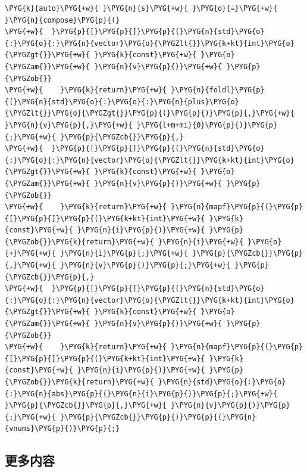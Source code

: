 \begin{codeblockbg}
\begin{Verbatim}[commandchars=\\\{\},breaklines=true,breakanywhere=true,fontsize=\codefont,xleftmargin=17bp]
\PYG{k}{auto}\PYG{+w}{ }\PYG{n}{s}\PYG{+w}{ }\PYG{o}{=}\PYG{+w}{ }\PYG{n}{compose}\PYG{p}{(}
\PYG{+w}{  }\PYG{p}{[}\PYG{p}{]}\PYG{p}{(}\PYG{n}{std}\PYG{o}{:}\PYG{o}{:}\PYG{n}{vector}\PYG{o}{\PYGZlt{}}\PYG{k+kt}{int}\PYG{o}{\PYGZgt{}}\PYG{+w}{ }\PYG{k}{const}\PYG{+w}{ }\PYG{o}{\PYGZam{}}\PYG{+w}{ }\PYG{n}{v}\PYG{p}{)}\PYG{+w}{ }\PYG{p}{\PYGZob{}}
\PYG{+w}{    }\PYG{k}{return}\PYG{+w}{ }\PYG{n}{foldl}\PYG{p}{(}\PYG{n}{std}\PYG{o}{:}\PYG{o}{:}\PYG{n}{plus}\PYG{o}{\PYGZlt{}}\PYG{o}{\PYGZgt{}}\PYG{p}{(}\PYG{p}{)}\PYG{p}{,}\PYG{+w}{ }\PYG{n}{v}\PYG{p}{,}\PYG{+w}{ }\PYG{l+m+mi}{0}\PYG{p}{)}\PYG{p}{;}\PYG{+w}{ }\PYG{p}{\PYGZcb{}}\PYG{p}{,}
\PYG{+w}{  }\PYG{p}{[}\PYG{p}{]}\PYG{p}{(}\PYG{n}{std}\PYG{o}{:}\PYG{o}{:}\PYG{n}{vector}\PYG{o}{\PYGZlt{}}\PYG{k+kt}{int}\PYG{o}{\PYGZgt{}}\PYG{+w}{ }\PYG{k}{const}\PYG{+w}{ }\PYG{o}{\PYGZam{}}\PYG{+w}{ }\PYG{n}{v}\PYG{p}{)}\PYG{+w}{ }\PYG{p}{\PYGZob{}}
\PYG{+w}{    }\PYG{k}{return}\PYG{+w}{ }\PYG{n}{mapf}\PYG{p}{(}\PYG{p}{[}\PYG{p}{]}\PYG{p}{(}\PYG{k+kt}{int}\PYG{+w}{ }\PYG{k}{const}\PYG{+w}{ }\PYG{n}{i}\PYG{p}{)}\PYG{+w}{ }\PYG{p}{\PYGZob{}}\PYG{k}{return}\PYG{+w}{ }\PYG{n}{i}\PYG{+w}{ }\PYG{o}{+}\PYG{+w}{ }\PYG{n}{i}\PYG{p}{;}\PYG{+w}{ }\PYG{p}{\PYGZcb{}}\PYG{p}{,}\PYG{+w}{ }\PYG{n}{v}\PYG{p}{)}\PYG{p}{;}\PYG{+w}{ }\PYG{p}{\PYGZcb{}}\PYG{p}{,}
\PYG{+w}{  }\PYG{p}{[}\PYG{p}{]}\PYG{p}{(}\PYG{n}{std}\PYG{o}{:}\PYG{o}{:}\PYG{n}{vector}\PYG{o}{\PYGZlt{}}\PYG{k+kt}{int}\PYG{o}{\PYGZgt{}}\PYG{+w}{ }\PYG{k}{const}\PYG{+w}{ }\PYG{o}{\PYGZam{}}\PYG{+w}{ }\PYG{n}{v}\PYG{p}{)}\PYG{+w}{ }\PYG{p}{\PYGZob{}}
\PYG{+w}{    }\PYG{k}{return}\PYG{+w}{ }\PYG{n}{mapf}\PYG{p}{(}\PYG{p}{[}\PYG{p}{]}\PYG{p}{(}\PYG{k+kt}{int}\PYG{+w}{ }\PYG{k}{const}\PYG{+w}{ }\PYG{n}{i}\PYG{p}{)}\PYG{+w}{ }\PYG{p}{\PYGZob{}}\PYG{k}{return}\PYG{+w}{ }\PYG{n}{std}\PYG{o}{:}\PYG{o}{:}\PYG{n}{abs}\PYG{p}{(}\PYG{n}{i}\PYG{p}{)}\PYG{p}{;}\PYG{+w}{ }\PYG{p}{\PYGZcb{}}\PYG{p}{,}\PYG{+w}{ }\PYG{n}{v}\PYG{p}{)}\PYG{p}{;}\PYG{+w}{ }\PYG{p}{\PYGZcb{}}\PYG{p}{)}\PYG{p}{(}\PYG{n}{vnums}\PYG{p}{)}\PYG{p}{;}
\end{Verbatim}
\end{codeblockbg}



\subsection{更多内容}


